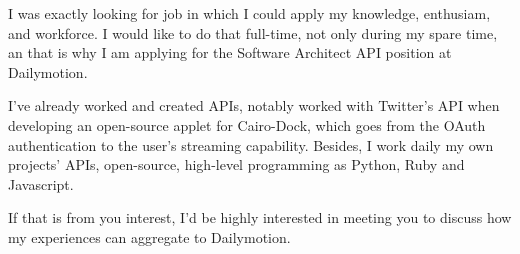 I was exactly looking for job in which I could apply my knowledge, enthusiam, and workforce. I would like to do that full-time, not only during my spare time, an that is why I am applying for the Software Architect API position at Dailymotion. 

I've already worked and created APIs, notably worked with Twitter's API when developing an open-source applet for Cairo-Dock, which goes from the OAuth authentication to the user's streaming capability. Besides, I work daily my own projects' APIs, open-source, high-level programming as Python, Ruby and Javascript.

If that is from you interest, I'd be highly interested in meeting you to discuss how my experiences can aggregate to Dailymotion.

\makeletterclosing